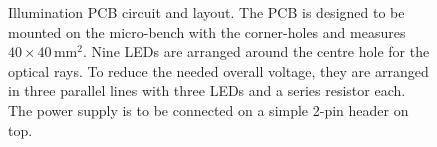 \documentclass[12pt,a4paper]{article}
\begin{document}
\begin{figure}[htbp]
  \centering
   \hfill
  
  \caption{Illumination PCB circuit and layout. 
  The PCB is designed to be mounted on the micro-bench with the corner-holes and measures $40\times40$\,mm$^2$. 
  Nine LEDs are arranged around the centre hole for the optical rays.
  To reduce the needed overall voltage, they are arranged in three parallel lines with three LEDs and a series resistor each.
  The power supply is to be connected on a simple 2-pin header on top.}
  \label{fig:illupcb}
\end{figure}
\end{document}
